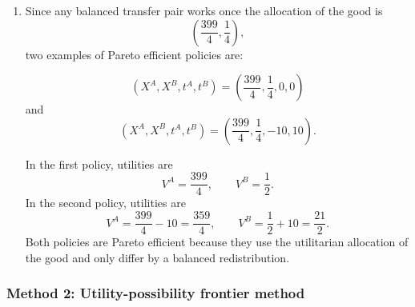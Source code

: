 \documentclass[12pt]{article}
\begin{document}
\begin{enumerate}[label=(\alph*)]
    \item
    Since any balanced transfer pair works once the allocation of the good is
    \[
    \left(\frac{399}{4},\frac14\right),
    \]
    two examples of Pareto efficient policies are:

    \[
    \boxed{
    \left(X^A,X^B,t^A,t^B\right)
    =
    \left(\frac{399}{4},\frac14,0,0\right)}
    \]
    and
    \[
    \boxed{
    \left(X^A,X^B,t^A,t^B\right)
    =
    \left(\frac{399}{4},\frac14,-10,10\right).}
    \]

    In the first policy, utilities are
    \[
    V^A=\frac{399}{4},
    \qquad
    V^B=\frac12.
    \]
    In the second policy, utilities are
    \[
    V^A=\frac{399}{4}-10=\frac{359}{4},
    \qquad
    V^B=\frac12+10=\frac{21}{2}.
    \]
    Both policies are Pareto efficient because they use the utilitarian allocation of the good and only differ by a balanced redistribution.
\end{enumerate}

\newpage
\subsubsection{Method 2: Utility-possibility frontier method}
\end{document}
